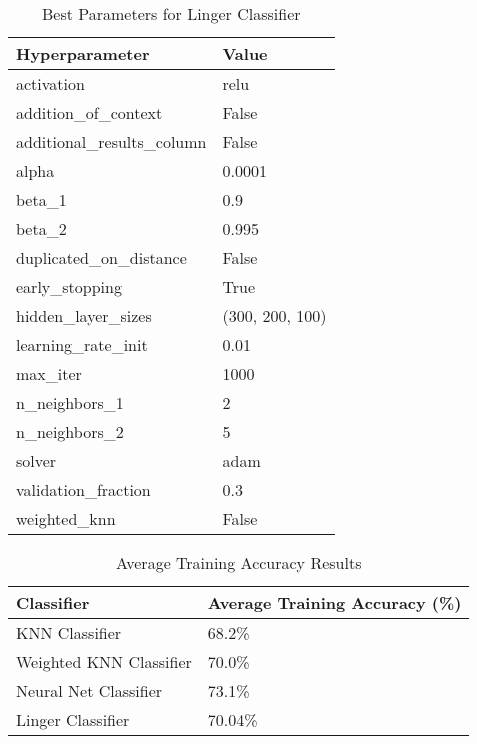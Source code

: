 \documentclass[a4paper, 12pt]{report}
\begin{document}
\begin{table}[H]
    \centering
    \caption{Best Parameters for Linger Classifier}
    \label{tab:best_parameters_linger_classifier_LC_Glass}
    \begin{tabular}{|l|l|}
    \hline
    \textbf{Hyperparameter} & \textbf{Value} \\ \hline
    activation & relu \\ \hline
    addition\_of\_context & False \\ \hline
    additional\_results\_column & False \\ \hline
    alpha & 0.0001 \\ \hline
    beta\_1 & 0.9 \\ \hline
    beta\_2 & 0.995 \\ \hline
    duplicated\_on\_distance & False \\ \hline
    early\_stopping & True \\ \hline
    hidden\_layer\_sizes & (300, 200, 100) \\ \hline
    learning\_rate\_init & 0.01 \\ \hline
    max\_iter & 1000 \\ \hline
    n\_neighbors\_1 & 2 \\ \hline
    n\_neighbors\_2 & 5 \\ \hline
    solver & adam \\ \hline
    validation\_fraction & 0.3 \\ \hline
    weighted\_knn & False \\ \hline
    \end{tabular}
\end{table}

\begin{table}[H]
    \centering
    \caption{Average Training Accuracy Results}
    \label{tab:average_results_train}
    \begin{tabular}{|l|l|}
    \hline
    \textbf{Classifier} & \textbf{Average Training Accuracy (\%)} \\ \hline
    KNN Classifier & 68.2\% \\ \hline
    Weighted KNN Classifier & 70.0\% \\ \hline
    Neural Net Classifier & 73.1\% \\ \hline
    Linger Classifier & 70.04\% \\ \hline
    \end{tabular}
\end{table}
\end{document}
